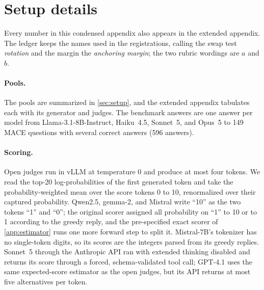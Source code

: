 \FloatBarrier
\section{Setup details}
\label{app:setup}

Every number in this condensed appendix also appears in the extended appendix. The ledger keeps the names used in the registrations, calling the swap test \emph{rot\-ation} and the margin the \emph{an\-choring margin}; the two rubric wordings are $a$ and $b$.

\paragraph{Pools.}
The pools are summarized in \cref{sec:setup}, and the extended appendix tabulates each with its generator and judges. The benchmark answers are one answer per model from Llama-3.1-8B-Instruct, Haiku~4.5, Sonnet~5, and Opus~5 to 149 \textsc{MACE} questions with several correct answers (596 answers). \paragraph{Scoring.}
Open judges run in vLLM at temperature 0 and produce at most four tokens. We read the top-20 log-probabilities of the first generated token and take the probability-weighted mean over the score tokens 0 to 10, renormalized over their captured probability. Qwen2.5, gemma-2, and Mistral write ``10'' as the two tokens ``1'' and ``0''; the original scorer assigned all probability on ``1'' to 10 or to 1 according to the greedy reply, and the pre-specified exact scorer of \cref{app:estimator} runs one more forward step to split it. Mistral-7B's tokenizer has no single-token digits, so its scores are the integers parsed from its greedy replies. Sonnet~5 through the Anthropic API ran with extended thinking disabled and returns its score through a forced, schema-validated tool call; GPT-4.1 uses the same expected-score estimator as the open judges, but its API returns at most five alternatives per token.

